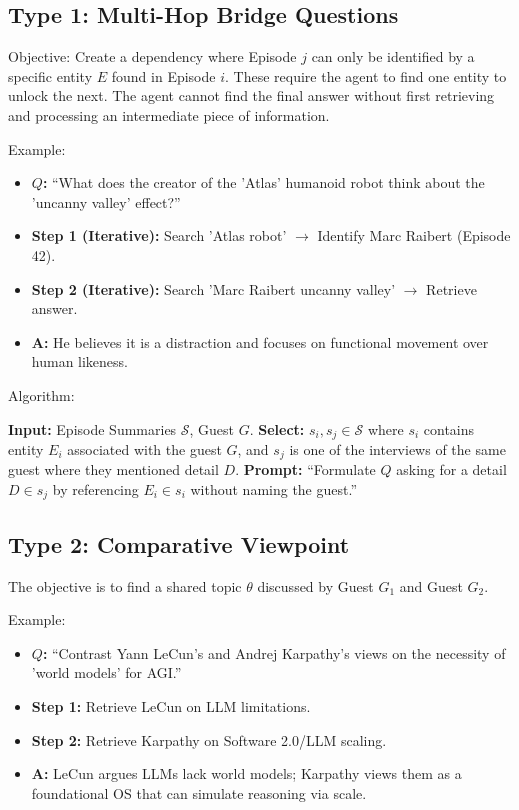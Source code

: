 \documentclass[11pt]{article}
\begin{document}
\subsection*{Type 1: Multi-Hop Bridge Questions}
Objective: Create a dependency where Episode $j$ can only be identified by a specific entity $E$ found in Episode $i$. These require the agent to find one entity to unlock the next. The agent cannot find the final answer without first retrieving and processing an intermediate piece of information.

\noindent
Example: 
\begin{itemize}
    \item \textbf{$Q$:} ``What does the creator of the 'Atlas' humanoid robot think about the 'uncanny valley' effect?''
    \item \textbf{Step 1 (Iterative):} Search 'Atlas robot' $\rightarrow$ Identify Marc Raibert (Episode 42).
    \item \textbf{Step 2 (Iterative):} Search 'Marc Raibert uncanny valley' $\rightarrow$ Retrieve answer.
    \item \textbf{A:} He believes it is a distraction and focuses on functional movement over human likeness.
\end{itemize}

\noindent
Algorithm:
\begin{algorithmic}[1]
\State \textbf{Input:} Episode Summaries $\mathcal{S}$, Guest $G$.
\State \textbf{Select:} $s_i, s_j \in \mathcal{S}$ where $s_i$ contains entity $E_i$ associated with the guest $G$, and $s_j$ is one of the interviews of the same guest where they mentioned detail $D$.
\State \textbf{Prompt:} ``Formulate $Q$ asking for a detail $D \in s_j$ by referencing $E_i \in s_i$ without naming the guest.''
\end{algorithmic}

\subsection*{Type 2: Comparative Viewpoint}
The objective is to find a shared topic $\theta$ discussed by Guest $G_1$ and Guest $G_2$.

\noindent
Example:
\begin{itemize}
    \item \textbf{$Q$:} ``Contrast Yann LeCun's and Andrej Karpathy's views on the necessity of 'world models' for AGI.''
    \item \textbf{Step 1:} Retrieve LeCun on LLM limitations.
    \item \textbf{Step 2:} Retrieve Karpathy on Software 2.0/LLM scaling.
    \item \textbf{A:} LeCun argues LLMs lack world models; Karpathy views them as a foundational OS that can simulate reasoning via scale.
\end{itemize}
\end{document}
